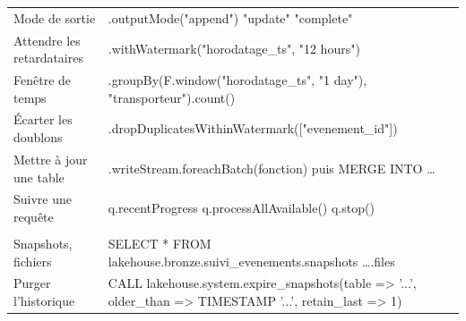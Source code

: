 \documentclass[11pt,a4paper]{article}
\begin{document}
\begin{center}
\begin{tabularx}{\textwidth}{@{}>{\raggedright\arraybackslash}p{4.1cm} >{\raggedright\arraybackslash\ttfamily\footnotesize}X@{}}
Mode de sortie & .outputMode("append") \quad "update" \quad "complete" \\
Attendre les retardataires & .withWatermark("horodatage\_ts", "12 hours") \\
Fenêtre de temps & .groupBy(F.window("horodatage\_ts", "1 day"), "transporteur").count() \\
Écarter les doublons & .dropDuplicatesWithinWatermark(["evenement\_id"]) \\
Mettre à jour une table & .writeStream.foreachBatch(fonction) \textrm{puis} MERGE INTO \dots \\
Suivre une requête & q.recentProgress \quad q.processAllAvailable() \quad q.stop() \\
\midrule
\multicolumn{2}{@{}l}{\textbf{\textcolor{lhblue}{Iceberg}}} \\
Snapshots, fichiers & SELECT * FROM lakehouse.bronze.suivi\_evenements.snapshots \quad \dots .files \\
Purger l'historique & CALL lakehouse.system.expire\_snapshots(table => '...', older\_than => TIMESTAMP '...', retain\_last => 1) \\
\bottomrule
\end{tabularx}
\end{center}
\end{document}
